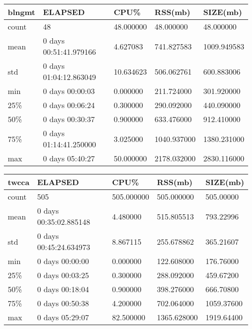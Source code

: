 \documentclass{article}
\begin{document}
\begin{table}[H]
\begin{tabular}{|l|l|l|l|l|}
\hline blngmt&                  ELAPSED&       CPU\%&      RSS(mb)&     SIZE(mb) \\
\hline count&                      48&  48.000000&    48.000000&    48.000000 \\
\hline mean&   0 days 00:51:41.979166&   4.627083&   741.827583&  1009.949583 \\
\hline std&    0 days 01:04:12.863049&  10.634623&   506.062761&   600.883006 \\
\hline min&           0 days 00:00:03&   0.000000&   211.724000&   301.920000 \\
\hline 25\%&           0 days 00:06:24&   0.300000&   290.092000&   440.090000 \\
\hline 50\%&           0 days 00:30:37&   0.900000&   633.476000&   912.410000 \\
\hline 75\%&    0 days 01:14:41.250000&   3.025000&  1040.937000&  1380.231000 \\
\hline max&           0 days 05:40:27&  50.000000&  2178.032000&  2830.116000 \\
\hline
\end{tabular}
\label{TABLE-SessionSizeblngmt}
\end{table}

\begin{table}[H]
\begin{tabular}{|l|l|l|l|l|}
\hline twcca& ELAPSED&   CPU\%&  RSS(mb)&   SIZE(mb) \\
\hline count&    505& 505.000000&  505.000000&  505.00000 \\
\hline mean&  0 days 00:35:02.885148&  4.480000&  515.805513&  793.22996 \\
\hline std&  0 days 00:45:24.634973&  8.867115&  255.678862&  365.21607 \\
\hline min&   0 days 00:00:00&  0.000000&  122.608000&  176.76000 \\
\hline 25\%&   0 days 00:03:25&  0.300000&  288.092000&  459.67200 \\
\hline 50\%&   0 days 00:18:04&  0.900000&  398.276000&  666.70800 \\
\hline 75\%&   0 days 00:50:38&  4.200000&  702.064000& 1059.37600 \\
\hline max&   0 days 05:29:07&  82.500000& 1365.628000& 1919.64400 \\
\hline 
\end{tabular}
\label{TABLE-SessionSizetwcca}
\end{table}
\end{document}
